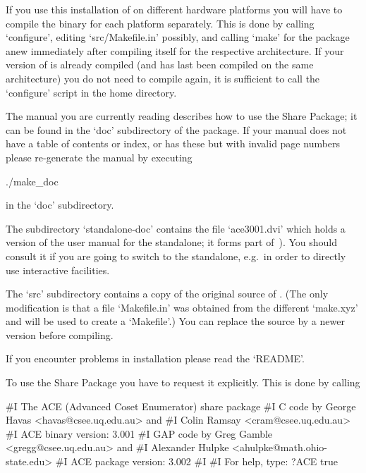 If you use this installation of {\GAP} on different hardware platforms
you will have to compile the binary for each platform separately. This
is done by calling `configure',  editing  `src/Makefile.in'  possibly,
and calling `make' for the package anew  immediately  after  compiling
{\GAP} itself for the respective  architecture.  If  your  version  of
{\GAP} is already compiled (and has last been  compiled  on  the  same
architecture)  you  do  not  need  to  compile  {\GAP}  again,  it  is
sufficient  to  call  the  `configure'  script  in  the  {\GAP}   home
directory.

The manual you are currently reading describes how to use  the  {\ACE}
Share Package; it can be  found  in  the  `doc'  subdirectory  of  the
package. If your manual does not have a table of contents or index, or
has these but with invalid page numbers please re-generate the  manual
by executing

\begintt
./make_doc
\endtt

in the `doc' subdirectory.

The  subdirectory  `standalone-doc'  contains the  file  `ace3001.dvi'
which holds a version of the user manual for the {\ACE} standalone; it
forms part of~\cite{Ram99}).  You  should consult it if  you are going
to  switch to  the {\ACE}  standalone, e.g.~in  order to  directly use
interactive facilities.

The  `src' subdirectory  contains a  copy  of the  original source  of
{\ACE}.  (The  only modification  is  that  a  file `Makefile.in'  was
obtained from  the different `make.xyz' and  will be used  to create a
`Makefile'.)  You  can replace  the source by  a newer  version before
compiling.

If you encounter problems in installation please read the `README'.


To use the {\ACE} Share Package you have  to  request  it  explicitly.
This is done by calling

\beginexample
#I    The ACE (Advanced Coset Enumerator) share package
#I    C code by George Havas <havas@csee.uq.edu.au> and
#I              Colin Ramsay <cram@csee.uq.edu.au>
#I                   ACE binary version: 3.001
#I    GAP code by Greg Gamble <gregg@csee.uq.edu.au> and
#I           Alexander Hulpke <ahulpke@math.ohio-state.edu>
#I                   ACE package version: 3.002
#I  
#I                   For help, type: ?ACE
true
\endexample

